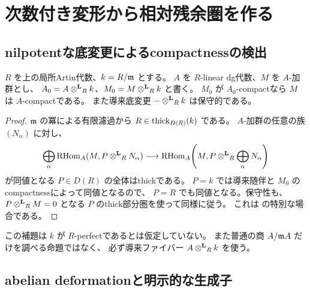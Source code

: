 \section{次数付き変形から相対残余圏を作る}\label{sec:relative}

\subsection{nilpotentな底変更によるcompactnessの検出}

\begin{lemma}\label{lem:descent}
 \(R\) を上の局所Artin代数、\(k=R/\mathfrak m\) とする。
 \(A\) を \(R\)-linear dg代数、\(M\) を \(A\)-加群とし、
 \(A_0=A\mathbin{\otimes^{\mathbf L}}_R k\)、\(M_0=M\mathbin{\otimes^{\mathbf L}}_R k\) と書く。
 \(M_0\) が \(A_0\)-compactなら \(M\) は \(A\)-compactである。
 また導来底変更 \(-\mathbin{\otimes^{\mathbf L}}_R k\) は保守的である。
\end{lemma}
\begin{proof}
 \(\mathfrak m\) の冪による有限濾過から
 \(R\in\operatorname{thick}_{D(R)}(k)\) である。
 \(A\)-加群の任意の族 \((N_\alpha)\) に対し、
 \[
 \bigoplus_\alpha\operatorname{RHom}_A(M,P\mathbin{\otimes^{\mathbf L}}_RN_\alpha)
 \longrightarrow
 \operatorname{RHom}_A\!\left(M,P\mathbin{\otimes^{\mathbf L}}_R\bigoplus_\alpha N_\alpha\right)
 \]
 が同値となる \(P\in D(R)\) の全体はthickである。
 \(P=k\) では導来随伴と \(M_0\) のcompactnessによって同値となるので、
 \(P=R\) でも同値となる。保守性も、
 \(P\mathbin{\otimes^{\mathbf L}}_RM=0\) となる \(P\) のthick部分圏を使って同様に従う。
 これは \cite[Propositions 3.28, 3.35; Remark 3.29]{Mathew}
 の特別な場合である。
\end{proof}

\begin{remark}
 この補題は \(k\) が \(R\)-perfectであるとは仮定していない。
 また普通の商 \(A/\mathfrak m A\) だけを調べる命題ではなく、
 必ず導来ファイバー \(A\mathbin{\otimes^{\mathbf L}}_Rk\) を使う。
\end{remark}

\subsection{abelian deformationと明示的な生成子}

